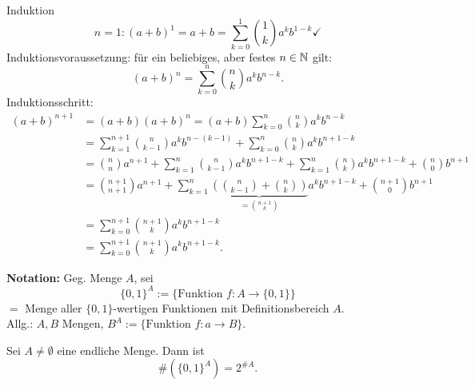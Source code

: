 \documentclass[../ana1.tex]{subfiles}
\begin{document}
\begin{bew} Induktion
	\[ n=1: {(a+b)}^1 = a+b = \sum_{k=0}^{1}\binom{1}{k} a^k b^{1-k} \checkmark{} \]
	Induktionsvoraussetzung: für ein beliebiges, aber festes \(n \in\mathbb{N} \) gilt:
	\[ {(a+b)}^n = \sum_{k=0}^{n} \binom{n}{k} a^k b^{n-k}. \]
	Induktionsschritt:
	\begin{align*}
		{(a+b)}^{n+1} & = (a+b) {(a+b)}^n = (a+b) \sum_{k=0}^{n} \binom{n}{k} a^k b^{n-k}                                                                                            \\
		              & = \sum_{k=1}^{n+1} \binom{n}{k-1} a^k b^{n-(k-1)} + \sum_{k=0}^{n} \binom{n}{k} a^k b^{n+1-k}                                                                \\
		              & = \binom{n}{n} a^{n+1} + \sum_{k=1}^{n} \binom{n}{k-1} a^k b^{n+1-k} + \sum_{k=1}^{n} \binom{n}{k} a^k b^{n+1-k} + \binom{n}{0} b^{n+1}                      \\
		              & = \binom{n+1}{n+1} a^{n+1} + \sum_{k=1}^{n} \underbrace{\left(\binom{n}{k-1} + \binom{n}{k}\right)}_{=\binom{n+1}{k}} a^k b^{n+1-k} + \binom{n+1}{0} b^{n+1} \\
		              & = \sum_{k=0}^{n+1} \binom{n+1}{k} a^k b^{n+1-k}                                                                                                              \\
		              & = \sum_{k=0}^{n+1} \binom{n+1}{k} a^k b^{n+1-k}.
	\end{align*}
\end{bew}
\textbf{Notation:} Geg. Menge \(A\), sei \[ {\{0,1\}}^A := \{ \text{Funktion }f:A\rightarrow \{0,1\} \} \] \(= \) Menge aller \( \{0,1\} \)-wertigen Funktionen mit Definitionsbereich \(A\).\\
Allg.: \(A,B\) Mengen, \(B^A := \{ \text{Funktion } f: a\rightarrow B\} \).
\begin{satz}
	Sei \(A\neq\emptyset \) eine endliche Menge. Dann ist 
	\[ \#( {\{0,1\}}^A) = 2^{\#A}.\]
\end{satz}
\end{document}
